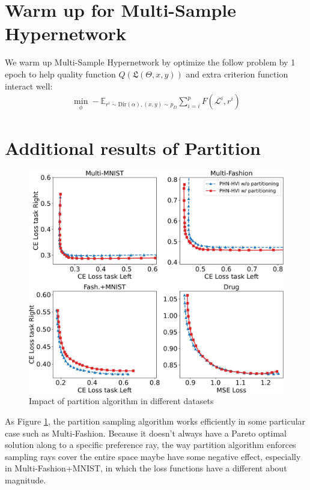 \documentclass[letterpaper]{article} %
\begin{document}
\section{Warm up for Multi-Sample Hypernetwork}
We warm up Multi-Sample Hypernetwork by optimize the follow problem by 1 epoch to help quality function $ Q(\mathfrak{L}(\Theta,x, y))$ and extra criterion function interact well:
\begin{align}
    \min_\phi - \mathbb{E}_{r^i\sim \text{Dir}\left(\alpha \right), (x,y) \sim p_D} \sum_{i=i}^p F(\mathcal{L}^i, r^i)
\end{align}

\section{Additional results of Partition}
\begin{figure}[htb]
    \centering
    \includegraphics[width=.95\columnwidth]{figures/Partition_All.pdf}
    \caption{Impact of partition algorithm in different datasets}
    \label{fig:partition_all}
\end{figure}
As Figure \ref{fig:partition_all}, the partition sampling algorithm works efficiently in some particular case such as Multi-Fashion. Because it doesn't always have a Pareto optimal solution along to a specific preference ray, the way partition algorithm enforces sampling rays cover the entire space maybe have some negative effect, especially in Multi-Fashion+MNIST, in which the loss functions have a different about magnitude.
\end{document}
